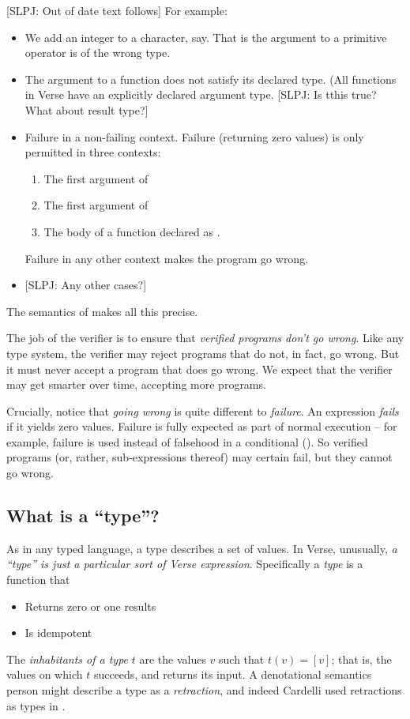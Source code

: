 \documentclass[acmsmall,review,anonymous,dvipsnames]{acmart}\settopmatter{printfolios=true,printccs=false,printacmref=false}
\newcommand{\simon}[1]{{\color{dkblue} [{SLPJ}: #1]}}
\newcommand{\simon}[1]{}
\newcommand{\vtt}[1]{\text{\tt #1}}
\begin{document}
\simon{Out of date text follows}
For example:
\begin{itemize}
\item We add an integer to a character, say.  That is the argument to a primitive operator is of the wrong type.
\item The argument to a function does not satisfy its declared type.  (All functions in Verse have an explicitly declared argument type. \simon{Is tthis true?  What about result type?}
\item Failure in a non-failing context.
Failure (returning zero values) is only permitted in three contexts:
\begin{enumerate}
\item The first argument of \vtt{if}
\item The first argument of \vtt{for}
\item The body of a function declared as \vtt{<decides>}.
\end{enumerate}
Failure in any other context makes the program go wrong.
\item \simon{Any other cases?}
\end{itemize}
The semantics of  makes all this precise.

The job of the verifier is to ensure that \emph{verified programs don't go wrong}.
Like any type system, the verifier may reject programs that do not, in fact, go wrong.
But it must never accept a program that does go wrong.
We expect that the verifier may get smarter over time, accepting more
programs.

Crucially, notice that \emph{going wrong} is quite different
to \emph{failure}.  An expression \emph{fails} if it yields zero values.
Failure is fully expected as part of normal execution -- for example, failure is used
instead of falsehood in a conditional ().  So verified programs
(or, rather, sub-expressions thereof) may certain fail, but they cannot go wrong.

\subsection{What is a ``type''?} \label{sec:what-is-a-type}

As in any typed language, a type describes a set of values.  In
Verse, unusually, \emph{a ``type'' is just a particular sort of Verse expression}.
Specifically a \emph{type} is a function that
\begin{itemize}
\item Returns zero or one results
\item Is idempotent
\end{itemize}
The \emph{inhabitants of a type} $t$ are the values $v$ such that $t(v) = [v]$; that is, the values
on which $t$ succeeds, and returns its input.
A denotational semantics person might describe a type as a \emph{retraction}, and
indeed Cardelli used retractions as types in \cite{cardelli:type-in-type}.
\end{document}
